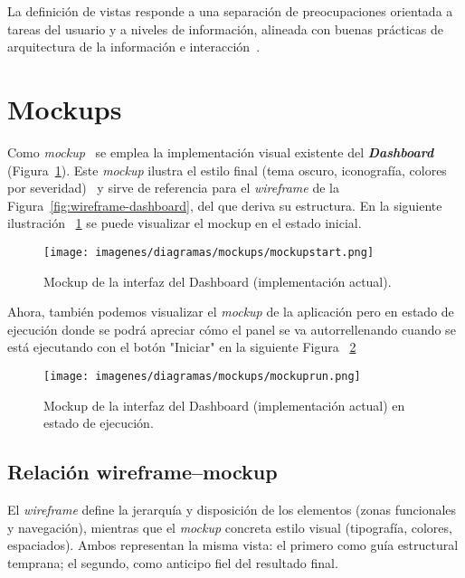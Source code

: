 La definición de vistas responde a una separación de preocupaciones orientada a tareas del usuario y a niveles de información, alineada con buenas prácticas de arquitectura de la información e interacción~\cite{garrett2010elements,tidwell2019designing}.

\section{Mockups}
\label{sec:mockups}

Como \emph{mockup}~\cite{cooper2014aboutface,tidwell2019designing} se emplea la implementación visual existente del \textbf{\textit{Dashboard}} (Figura~\ref{fig:mockup-dashboard}). Este \textit{mockup} ilustra el estilo final (tema oscuro, iconografía, colores por severidad)~\cite{iso9241-210} y sirve de referencia para el \emph{wireframe} de la Figura~\ref{fig:wireframe-dashboard}, del que deriva su estructura. En la siguiente ilustración ~\ref{fig:mockup-dashboard} se puede visualizar el mockup en el estado inicial.

\begin{figure}[H]
  \centering
  \texttt{[image: imagenes/diagramas/mockups/mockupstart.png]}
  \caption{Mockup de la interfaz del Dashboard (implementación actual).}
  \label{fig:mockup-dashboard}
\end{figure}

Ahora, también podemos visualizar el \textit{mockup} de la aplicación pero en estado de ejecución donde se podrá apreciar cómo el panel se va autorrellenando cuando se está ejecutando con el botón "Iniciar" en la siguiente Figura ~\ref{fig:mockup-dashboard-run}

\begin{figure}[H]
  \centering
  \texttt{[image: imagenes/diagramas/mockups/mockuprun.png]}
  \caption{Mockup de la interfaz del Dashboard (implementación actual) en estado de ejecución.}
  \label{fig:mockup-dashboard-run}
\end{figure}

\subsection*{Relación wireframe–mockup}
El \emph{wireframe} define la jerarquía y disposición de los elementos (zonas funcionales y navegación), mientras que el \emph{mockup} concreta estilo visual (tipografía, colores, espaciados). Ambos representan la misma vista: el primero como guía estructural temprana; el segundo, como anticipo fiel del resultado final.
